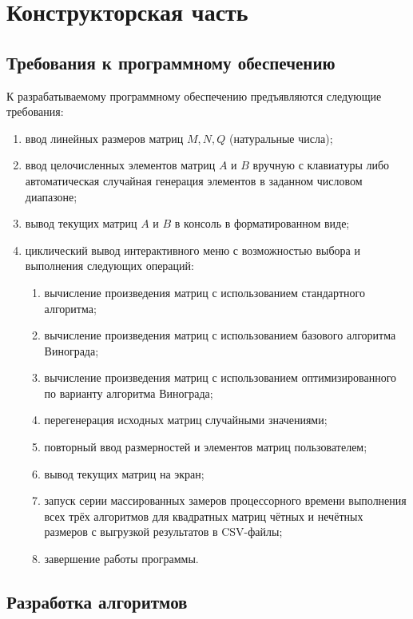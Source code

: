 \chapter{Конструкторская часть}

\section{Требования к программному обеспечению}

К разрабатываемому программному обеспечению предъявляются следующие требования:

\begin{enumerate}
    \item ввод линейных размеров матриц $M, N, Q$ (натуральные числа);
    \item ввод целочисленных элементов матриц $A$ и $B$ вручную с клавиатуры либо автоматическая случайная генерация элементов в заданном числовом диапазоне;
    \item вывод текущих матриц $A$ и $B$ в консоль в форматированном виде;
    \item циклический вывод интерактивного меню с возможностью выбора и выполнения следующих операций:
    \begin{enumerate}[label=\arabic{enumi}.\arabic*.]
        \item вычисление произведения матриц с использованием стандартного алгоритма;
        \item вычисление произведения матриц с использованием базового алгоритма Винограда;
        \item вычисление произведения матриц с использованием оптимизированного по варианту алгоритма Винограда;
        \item перегенерация исходных матриц случайными значениями;
        \item повторный ввод размерностей и элементов матриц пользователем;
        \item вывод текущих матриц на экран;
        \item запуск серии массированных замеров процессорного времени выполнения всех трёх алгоритмов для квадратных матриц чётных и нечётных размеров с выгрузкой результатов в CSV-файлы;
        \item завершение работы программы.
    \end{enumerate}
\end{enumerate}

\section{Разработка алгоритмов}


